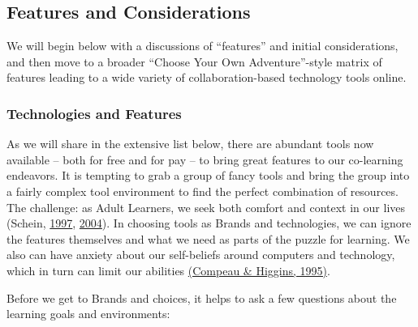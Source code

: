 \subsection{Features and Considerations}

We will begin below with a discussions of ``features'' and initial
considerations, and then move to a broader ``Choose Your Own
Adventure''-style matrix of features leading to a wide variety of
collaboration-based technology tools online.

\subsubsection{Technologies and Features}

As we will share in the extensive list below, there are abundant tools
now available -- both for free and for pay -- to bring great features to
our co-learning endeavors. It is tempting to grab a group of fancy tools
and bring the group into a fairly complex tool environment to find the
perfect combination of resources. The challenge: as Adult Learners, we
seek both comfort and context in our lives (Schein,
\href{\#schein97}{1997}, \href{\#schein04}{2004}). In choosing tools as
Brands and technologies, we can ignore the features themselves and what
we need as parts of the puzzle for learning. We also can have anxiety
about our self-beliefs around computers and technology, which in turn
can limit our abilities \href{\#compeau}{(Compeau \& Higgins, 1995)}.

Before we get to Brands and choices, it helps to ask a few questions
about the learning goals and environments:

